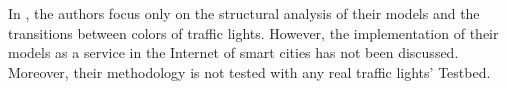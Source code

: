 In \cite{huang_modular_2014} \cite{difebbraro_trafficresponsive_2006} \cite{febbraro_using_2009} \cite{dossantossoares_modular_2012},
	the authors focus only on the structural analysis of their models and the transitions between colors of traffic lights.
However,
	the implementation of their models as a service in the Internet of smart cities has not been discussed.
Moreover,
	their methodology is not tested with any real traffic lights' Testbed.
